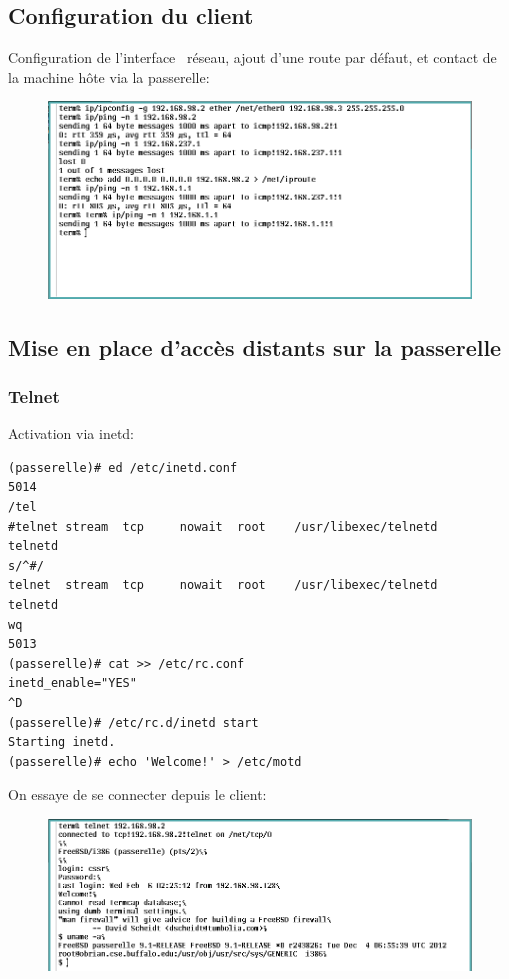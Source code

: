 \documentclass[a4paper]{article}
\begin{document}
\subsection{Configuration du client}
Configuration de l'\og interface \fg\ réseau, ajout d'une route par
défaut, et contact de la machine hôte via la passerelle:
\begin{figure}[!ht]
	\centering
	\includegraphics[scale=.5]{ipconfig.png}
\end{figure}

\subsection{Mise en place d'accès distants sur la passerelle}
\subsubsection{Telnet}
Activation via inetd:
\begin{verbatim}
(passerelle)# ed /etc/inetd.conf 
5014
/tel
#telnet stream  tcp     nowait  root    /usr/libexec/telnetd    telnetd
s/^#/
telnet  stream  tcp     nowait  root    /usr/libexec/telnetd    telnetd
wq
5013
(passerelle)# cat >> /etc/rc.conf 
inetd_enable="YES"
^D
(passerelle)# /etc/rc.d/inetd start
Starting inetd.
(passerelle)# echo 'Welcome!' > /etc/motd
\end{verbatim}

On essaye de se connecter depuis le client:
\begin{figure}[!ht]
	\centering
	\includegraphics[scale=.5]{telnet.png}
\end{figure}
\end{document}

